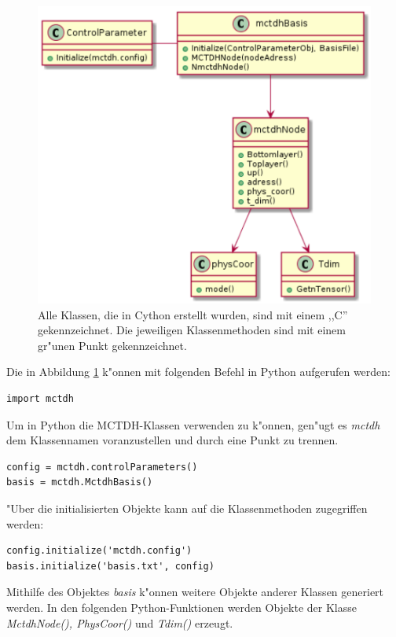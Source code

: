 \begin{figure}
    \centering
    \includegraphics[scale=0.6]{figures/sequenceDiagram}
    \caption{Alle Klassen, die in Cython erstellt wurden, sind mit einem ,,C'' gekennzeichnet. Die jeweiligen Klassenmethoden sind mit einem
    gr"unen Punkt gekennzeichnet.}\label{fig:uml_Cython}
\end{figure}
Die in Abbildung \ref{fig:uml_Cython} k"onnen mit folgenden Befehl in Python aufgerufen werden:

\begin{verbatim}
import mctdh
\end{verbatim}

Um in Python die MCTDH-Klassen verwenden zu k"onnen, gen"ugt es \textit{mctdh} dem Klassennamen voranzustellen und durch eine Punkt zu trennen.

\begin{verbatim}
config = mctdh.controlParameters()
basis = mctdh.MctdhBasis()
\end{verbatim}

"Uber die initialisierten Objekte kann auf die Klassenmethoden zugegriffen werden: 
\begin{verbatim}
config.initialize('mctdh.config')
basis.initialize('basis.txt', config)
\end{verbatim}

Mithilfe des Objektes \textit{basis} k"onnen weitere Objekte anderer Klassen generiert werden.
In den folgenden Python-Funktionen werden Objekte der Klasse \textit{MctdhNode(), PhysCoor()} und \textit{Tdim()} erzeugt. 

